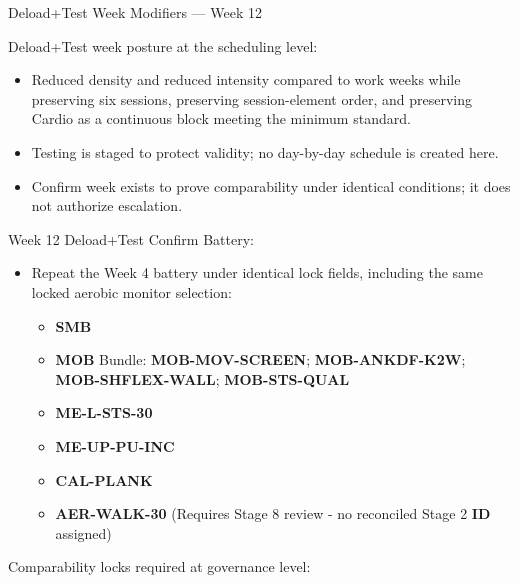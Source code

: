 \documentclass[10pt]{article}
\begin{document}
\begin{landscape}
Deload+Test Week Modifiers — Week 12\par\vspace{0.25em}

Deload+Test week posture at the scheduling level:

\begin{itemize}
\item Reduced density and reduced intensity compared to work weeks while preserving six sessions, preserving session-element order, and preserving Cardio as a continuous block meeting the minimum standard.
\item Testing is staged to protect validity; no day-by-day schedule is created here.
\item Confirm week exists to prove comparability under identical conditions; it does not authorize escalation.
\end{itemize}

Week 12 Deload+Test Confirm Battery:

\begin{itemize}
\item Repeat the Week 4 battery under identical lock fields, including the same locked aerobic monitor selection:
\begin{itemize}
\item \textbf{SMB}
\item \textbf{MOB} Bundle: \textbf{MOB-MOV-SCREEN}; \textbf{MOB-ANKDF-K2W}; \textbf{MOB-SHFLEX-WALL}; \textbf{MOB-STS-QUAL}
\item \textbf{ME-L-STS-30}
\item \textbf{ME-UP-PU-INC}
\item \textbf{CAL-PLANK}
\item \textbf{AER-WALK-30} (Requires Stage 8 review - no reconciled Stage 2 \textbf{ID} assigned)
\end{itemize}
\end{itemize}

Comparability locks required at governance level:


\end{landscape}
\end{document}

